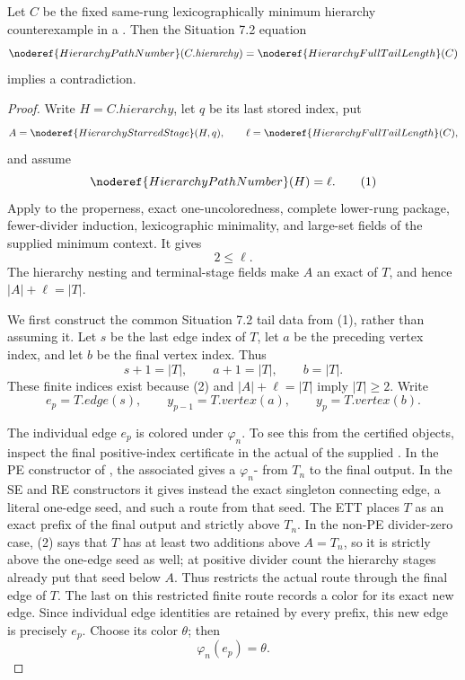\begin{lemma}
Let \(C\) be the fixed same-rung lexicographically minimum hierarchy
counterexample in a
.  Then the Situation 7.2
equation
\[
 \noderef{HierarchyPathNumber}(C.\mathit{hierarchy})
     =\noderef{HierarchyFullTailLength}(C)
\]
implies a contradiction.
\end{lemma}
\begin{proof}
Write \(H=C.\mathit{hierarchy}\), let \(q\) be its last stored index, put
\[
 A=\noderef{HierarchyStarredStage}(H,q),\qquad
 \ell=\noderef{HierarchyFullTailLength}(C),
\]
and assume
\[
                 \noderef{HierarchyPathNumber}(H)=\ell.      \tag{1}
\]
Apply  to the properness,
exact one-uncoloredness, complete lower-rung package, fewer-divider
induction, lexicographic minimality, and large-set fields of the supplied
minimum context.  It gives
\[
                              2\le\ell.                       \tag{2}
\]
The hierarchy nesting and terminal-stage fields make \(A\) an exact
 of \(T\), and hence
\(|A|+\ell=|T|\).

We first construct the common Situation 7.2 tail data from (1), rather
than assuming it.  Let \(s\) be the last edge index of \(T\), let \(a\)
be the preceding vertex index, and let \(b\) be the final vertex index.
Thus
\[
 s+1=|T|,\qquad a+1=|T|,\qquad b=|T|.                        \tag{3}
\]
These finite indices exist because (2) and \(|A|+\ell=|T|\) imply
\(|T|\ge2\).  Write
\[
        e_p=T.\mathit{edge}(s),\qquad
        y_{p-1}=T.\mathit{vertex}(a),\qquad
        y_p=T.\mathit{vertex}(b).                            \tag{4}
\]

The individual edge \(e_p\) is colored under \(\varphi_n\).  To see this
from the certified objects, inspect the final positive-index certificate
in the actual  of the supplied
.  In the PE constructor of
, the associated
 gives a
\(\varphi_n\)- from \(T_n\) to the
final output.  In the SE and RE constructors it gives instead the exact
singleton connecting edge, a literal one-edge seed, and such a route from
that seed.  The ETT places \(T\) as an exact prefix of the final output and
strictly above \(T_n\).  In the non-PE divider-zero case, (2) says that
\(T\) has at least two additions above \(A=T_n\), so it is strictly above
the one-edge seed as well; at positive divider count the hierarchy stages
already put that seed below \(A\).  Thus
 restricts the actual route
through the final edge of \(T\).  The last
 on this restricted finite route records a
color for its exact new edge.  Since individual edge identities are
retained by every prefix, this new edge is precisely \(e_p\).  Choose its
color \(\theta\); then
\[
                         \varphi_n(e_p)=\theta.               \tag{5}
\]


\end{proof}

